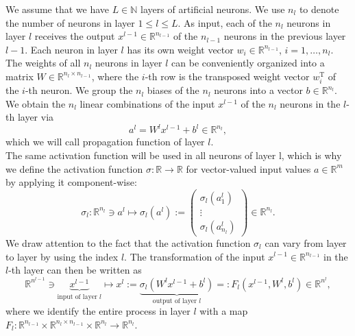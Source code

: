 We assume that we have $L \in \mathbb{N}$ layers of artificial neurons. We use $n_l$ to denote the number of neurons in layer $1 \leq l \leq L$. As input, each of the $n_l$ neurons in layer $l$ receives the output $x^{l-1} \in \mathbb{R}^{n_{l-1}}$ of the $n_{l-1}$ neurons in the previous layer $l-1$. Each neuron in layer $l$ has its own weight vector $w_i \in \mathbb{R}^{n_{l-1}}$, $i = 1, \ldots, n_l$. The weights of all $n_l$ neurons in layer $l$ can be conveniently organized into a matrix $W \in \mathbb{R}^{n_l \times n_{l-1}}$, where the $i$-th row is the transposed weight vector $w^{\mathrm{T}}_i$ of the $i$-th neuron. We group the $n_l$ biases of the $n_l$ neurons into a vector $b \in \mathbb{R}^{n_l}$. We obtain the $n_l$ linear combinations of the input $x^{l-1}$ of the $n_l$ neurons in the $l$-th layer via 
\begin{equation}
    \label{propagation function}
    a^l = W^l x^{l-1} + b^l \in \mathbb{R}^{n_l},
\end{equation}
which we will call propagation function of layer $l$. \\
The same activation function will be used in all neurons of layer l, which is why we define the activation function $\sigma \colon \mathbb{R} \to \mathbb{R}$ for vector-valued input values $a \in \mathbb{R}^m$ by applying it component-wise:
\begin{equation*}
    \sigma_l \colon \mathbb{R}^{n_l} \ni a^l \mapsto \sigma_l (a^l):= \left(
        \begin{array}
            {c} \sigma_l \left( a^l_{1} \right) \\
            \vdots \\
            \sigma_l \left( a^l_{n_l} \right)
        \end{array}
        \right) \in \mathbb{R}^{n_l}.
\end{equation*}
We draw attention to the fact that the activation function $\sigma_l$ can vary from layer to layer by using the index $l$. The transformation of the input $x^{l-1} \in \mathbb{R}^{n_{l-1}}$ in the $l$-th layer can then be written as
\begin{equation}
    \label{action layer}
    \mathbb{R}^{n^{l-1}} \ni \underbrace{x^{l-1}}_{\text{input of layer } l} \mapsto x^{l}:=\underbrace{\sigma_{l}\left( W^{l} x^{l-1} + b^{l} \right)}_{\text{output of layer } l}=: F_{l} \left(x^{l-1}, W^{l}, b^{l} \right) \in \mathbb{R}^{n^{l}}, 
\end{equation}
where we identify the entire process in layer $l$ with a map $F_l \colon \mathbb{R}^{n_{l-1}} \times \mathbb{R}^{n_l \times n_{l-1}} \times \mathbb{R}^{n_l} \to \mathbb{R}^{n_l}$. \\

